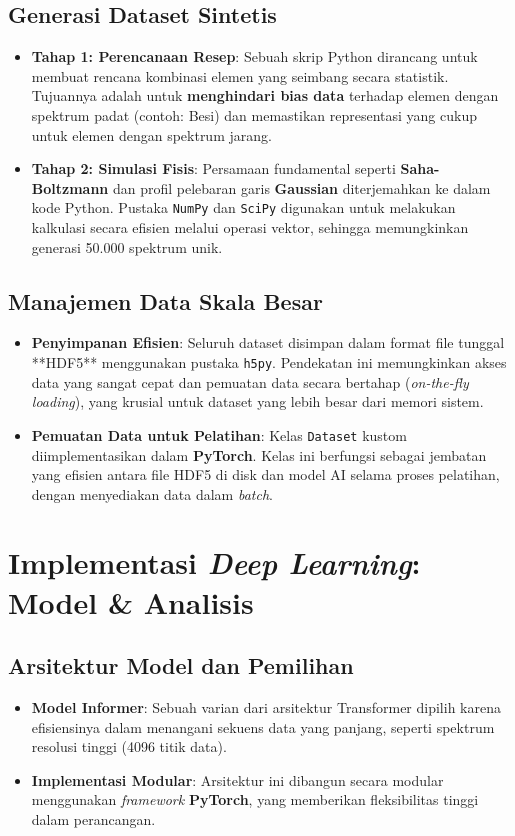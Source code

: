 \documentclass[12pt, a4paper]{article}
\newcommand{\subsectiontitle}[1]{\subsection*{\large\bfseries #1}}
\begin{document}
\subsectiontitle{Generasi Dataset Sintetis}
\begin{itemize}
    \item \textbf{Tahap 1: Perencanaan Resep}: Sebuah skrip Python dirancang untuk membuat rencana kombinasi elemen yang seimbang secara statistik. Tujuannya adalah untuk \textbf{menghindari bias data} terhadap elemen dengan spektrum padat (contoh: Besi) dan memastikan representasi yang cukup untuk elemen dengan spektrum jarang.
    \item \textbf{Tahap 2: Simulasi Fisis}: Persamaan fundamental seperti \textbf{Saha-Boltzmann} dan profil pelebaran garis \textbf{Gaussian} diterjemahkan ke dalam kode Python. Pustaka \texttt{NumPy} dan \texttt{SciPy} digunakan untuk melakukan kalkulasi secara efisien melalui operasi vektor, sehingga memungkinkan generasi 50.000 spektrum unik.
\end{itemize}

\subsectiontitle{Manajemen Data Skala Besar}
\begin{itemize}
    \item \textbf{Penyimpanan Efisien}: Seluruh dataset disimpan dalam format file tunggal **HDF5** menggunakan pustaka \texttt{h5py}. Pendekatan ini memungkinkan akses data yang sangat cepat dan pemuatan data secara bertahap (\textit{on-the-fly loading}), yang krusial untuk dataset yang lebih besar dari memori sistem.
    \item \textbf{Pemuatan Data untuk Pelatihan}: Kelas \texttt{Dataset} kustom diimplementasikan dalam \textbf{PyTorch}. Kelas ini berfungsi sebagai jembatan yang efisien antara file HDF5 di disk dan model AI selama proses pelatihan, dengan menyediakan data dalam \textit{batch}.
\end{itemize}

\section{Implementasi \textit{Deep Learning}: Model \& Analisis}

\subsectiontitle{Arsitektur Model dan Pemilihan}
\begin{itemize}
    \item \textbf{Model Informer}: Sebuah varian dari arsitektur Transformer dipilih karena efisiensinya dalam menangani sekuens data yang panjang, seperti spektrum resolusi tinggi (4096 titik data).
    \item \textbf{Implementasi Modular}: Arsitektur ini dibangun secara modular menggunakan \textit{framework} \textbf{PyTorch}, yang memberikan fleksibilitas tinggi dalam perancangan.
\end{itemize}
\end{document}
